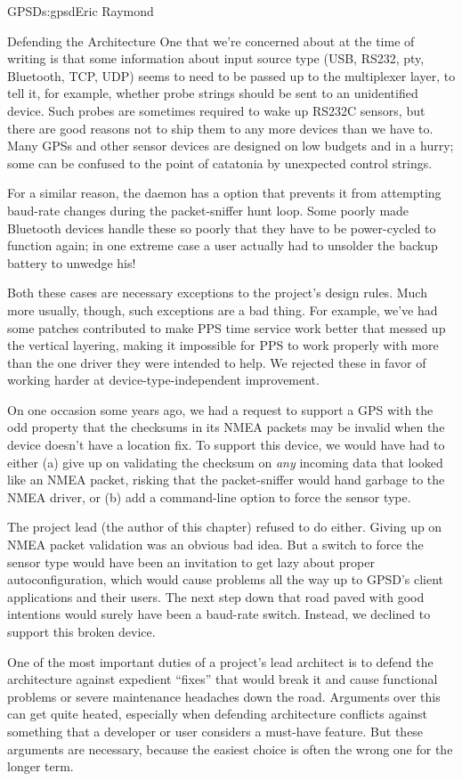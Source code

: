 \begin{aosachapter}{GPSD}{s:gpsd}{Eric Raymond}
\begin{aosasect1}{Defending the Architecture}
One that we're concerned about at the time of writing is that some
information about input source type (USB, RS232, pty, Bluetooth, TCP,
UDP) seems to need to be passed up to the multiplexer layer, to tell it,
for example, whether probe strings should be sent to an unidentified
device. Such probes are sometimes required to wake up RS232C sensors, but
there are good reasons not to ship them to any more devices than we
have to. Many GPSs and other sensor devices are designed on low
budgets and in a hurry; some can be confused to the point of catatonia
by unexpected control strings.

For a similar reason, the daemon has a  option that prevents 
it from attempting baud-rate changes  during the packet-sniffer
hunt loop.  Some poorly made Bluetooth devices handle these so poorly
that they have to be power-cycled to function again; in one
extreme case a user actually had to unsolder the backup battery to
unwedge his!

Both these cases are necessary exceptions to the project's design
rules.  Much more usually, though, such exceptions are a bad thing.
For example, we've had some patches contributed to make PPS time
service work better that messed up the vertical layering, making it
impossible for PPS to work properly with more than the one driver they
were intended to help. We rejected these in favor of working harder
at device-type-independent improvement.

On one occasion some years ago, we had a request to support a GPS with
the odd property that the checksums in its NMEA packets may be invalid
when the device doesn't have a location fix.  To support this device,
we would have had to either (a) give up on validating the checksum on
\emph{any} incoming data that looked like an NMEA packet, risking that
the packet-sniffer would hand garbage to the NMEA driver, or (b) add a
command-line option to force the sensor type.

The project lead (the author of this chapter) refused to do either.
Giving up on NMEA packet validation was an obvious bad idea.  But a
switch to force the sensor type would have been an invitation to get
lazy about proper autoconfiguration, which would cause problems all
the way up to GPSD's client applications and their users.  The next
step down that road paved with good intentions would surely have been
a baud-rate switch. Instead, we declined to support this broken device.

One of the most important duties of a project's lead architect is to
defend the architecture against expedient ``fixes'' that would break
it and cause functional problems or severe maintenance headaches
down the road.  Arguments over this can get quite heated,
especially when defending architecture conflicts against something
that a developer or user considers a must-have feature.  But these
arguments are necessary, because the easiest choice is often the wrong
one for the longer term.


\end{aosasect1}
\end{aosachapter}
